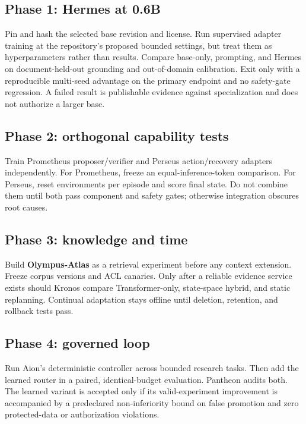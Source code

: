 \documentclass[10pt]{article}
\newcommand{\atlas}{\textbf{Olympus-Atlas}}
\begin{document}
\subsection{Phase 1: Hermes at 0.6B}

Pin and hash the selected base revision and license. Run supervised adapter
training at the repository's proposed bounded settings, but treat them as
hyperparameters rather than results. Compare base-only, prompting, and Hermes
on document-held-out grounding and out-of-domain calibration. Exit only with a
reproducible multi-seed advantage on the primary endpoint and no safety-gate
regression. A failed result is publishable evidence against specialization and
does not authorize a larger base.

\subsection{Phase 2: orthogonal capability tests}

Train Prometheus proposer/verifier and Perseus action/recovery adapters
independently. For Prometheus, freeze an equal-inference-token comparison. For
Perseus, reset environments per episode and score final state. Do not combine
them until both pass component and safety gates; otherwise integration obscures
root causes.

\subsection{Phase 3: knowledge and time}

Build \atlas{} as a retrieval experiment before any context extension. Freeze
corpus versions and ACL canaries. Only after a reliable evidence service exists
should Kronos compare Transformer-only, state-space hybrid, and static
replanning. Continual adaptation stays offline until deletion, retention, and
rollback tests pass.

\subsection{Phase 4: governed loop}

Run Aion's deterministic controller across bounded research tasks. Then add the
learned router in a paired, identical-budget evaluation. Pantheon audits both.
The learned variant is accepted only if its valid-experiment improvement is
accompanied by a predeclared non-inferiority bound on false promotion and zero
protected-data or authorization violations.
\end{document}
